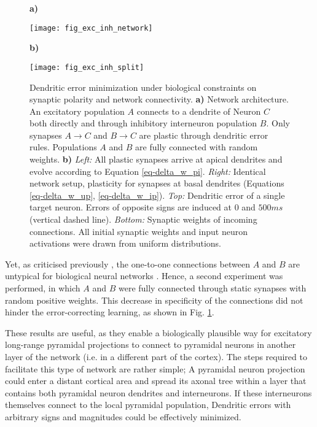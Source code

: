 \begin{figure}[t]
    \centering
    \begin{minipage}{0.2\textwidth}
        \textbf{a)}\par\medskip
        \centering
        \texttt{[image: fig\_exc\_inh\_network]}
    \end{minipage}\hfill
    \begin{minipage}{0.7\textwidth}
        \textbf{b)}\par\medskip
        \centering
        \texttt{[image: fig\_exc\_inh\_split]}
    \end{minipage}
    \caption{Dendritic error minimization under biological constraints on synaptic polarity and network connectivity.
        \textbf{a)} Network architecture. An excitatory population $A$ connects to a dendrite of Neuron $C$ both
        directly and through inhibitory interneuron population $B$. Only synapses $A\rightarrow C$ and $B \rightarrow C$
        are plastic through dendritic error rules. Populations $A$ and $B$ are fully connected with random weights.
        \textbf{b)} \textit{Left:} All plastic synapses arrive at apical dendrites and evolve according to Equation
        \ref{eq-delta_w_pi}. \textit{Right:} Identical network setup, plasticity for synapses at basal dendrites
        (Equations \ref{eq-delta_w_up}, \ref{eq-delta_w_ip}). \textit{Top:} Dendritic error of a single target neuron.
        Errors of opposite signs are induced at $0$ and $500ms$ (vertical dashed line). \textit{Bottom:} Synaptic
        weights of incoming connections. All initial synaptic weights and input neuron activations were drawn from
        uniform distributions.}
    \label{fig-exc-inh-split}
\end{figure}

Yet, as criticised previously \citep{whittington2019theories}, the one-to-one connections between $A$ and $B$ are
untypical for biological neural networks \citeme. Hence, a second experiment was performed, in which $A$ and $B$ were
fully connected through static synapses with random positive weights. This decrease in specificity of the connections
did not hinder the error-correcting learning, as shown in Fig. \ref{fig-exc-inh-split}.

These results are useful, as they enable a biologically plausible way for excitatory long-range pyramidal projections to
connect to pyramidal neurons in another layer of the network (i.e. in a different part of the cortex). The steps
required to facilitate this type of network are rather simple; A pyramidal neuron projection could enter a distant
cortical area and spread its axonal tree \phrasing within a layer that contains both pyramidal neuron dendrites and
interneurons. If these interneurons themselves connect to the local pyramidal population, Dendritic errors with
arbitrary signs and magnitudes could be effectively minimized.

